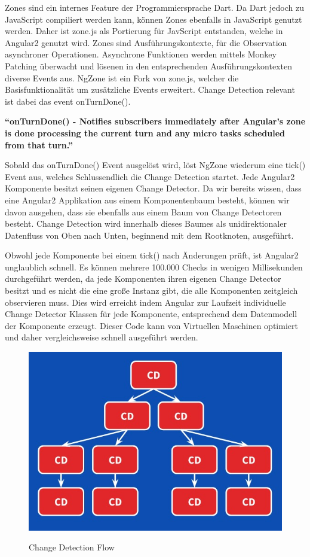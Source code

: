 Zones sind ein internes Feature der Programmiersprache Dart. Da Dart jedoch zu JavaScript compiliert werden kann,
können Zones ebenfalls in JavaScript genutzt werden. Daher ist zone.js als Portierung für JavScript entstanden, welche in Angular2 genutzt wird.
Zones sind Ausführungskontexte, für die Observation asynchroner Operationen.
Asynchrone Funktionen werden mittels Monkey Patching überwacht und lösenen in den entsprechenden Ausführungskontexten diverse Events aus.
NgZone ist ein Fork von zone.js, welcher die Basisfunktionalität um zusätzliche Events erweitert.
Change Detection relevant ist dabei das event onTurnDone().
\cite{changedetection-explained}

\vspace{0.5cm}
\textbf{``onTurnDone() - Notifies subscribers immediately after Angular’s zone is done processing the current turn and any micro tasks scheduled from that turn.''}
\cite{ZONESINANGULAR2}
\vspace{0.5cm}

Sobald das onTurnDone() Event ausgelöst wird, löst NgZone wiederum eine tick() Event aus, welches Schlussendlich die Change Detection startet.
Jede Angular2 Komponente besitzt seinen eigenen Change Detector. Da wir bereits wissen, dass eine Angular2 Applikation aus einem Komponentenbaum besteht,
können wir davon ausgehen, dass sie ebenfalls aus einem Baum von Change Detectoren besteht.
Change Detection wird innerhalb dieses Baumes als unidirektionaler Datenfluss von Oben nach Unten, beginnend mit dem Rootknoten, ausgeführt.

Obwohl jede Komponente bei einem tick() nach Änderungen prüft, ist Angular2 unglaublich schnell. Es können mehrere 100.000 Checks in wenigen Millisekunden durchgeführt werden,
da jede Komponenten ihren eigenen Change Detector besitzt und es nicht die eine große Instanz gibt, die alle Komponenten zeitgleich observieren muss.
Dies wird erreicht indem Angular zur Laufzeit individuelle Change Detector Klassen für jede Komponente, entsprechend dem Datenmodell der Komponente erzeugt.
Dieser Code kann von Virtuellen Maschinen optimiert und daher vergleichsweise schnell ausgeführt werden.

\vspace{1cm}

\begin{figure}[ht]
 \centering
 \includegraphics[width=0.7\linewidth]{kapitel3/cd-tree.jpg}
 \caption{Change Detection Flow}\cite{changedetection-explained}
\end{figure}


